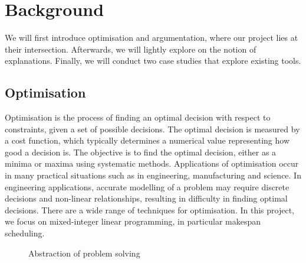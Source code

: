 \chapter{Background}

We will first introduce optimisation and argumentation, where our project lies at their intersection. Afterwards, we will lightly explore on the notion of explanations. Finally, we will conduct two case studies that explore existing tools.

\section{Optimisation}

Optimisation is the process of finding an optimal decision with respect to constraints, given a set of possible decisions. The optimal decision is measured by a cost function, which typically determines a numerical value representing how good a decision is. The objective is to find the optimal decision, either as a minima or maxima using systematic methods. Applications of optimisation occur in many practical situations such as in engineering, manufacturing and science. In engineering applications, accurate modelling of a problem may require discrete decisions and non-linear relationships, resulting in difficulty in finding optimal decisions. There are a wide range of techniques for optimisation. In this project, we focus on mixed-integer linear programming, in particular makespan scheduling.

\begin{figure}[H]
	\begin{center}
	\end{center}
	\caption{Abstraction of problem solving}
\end{figure}

